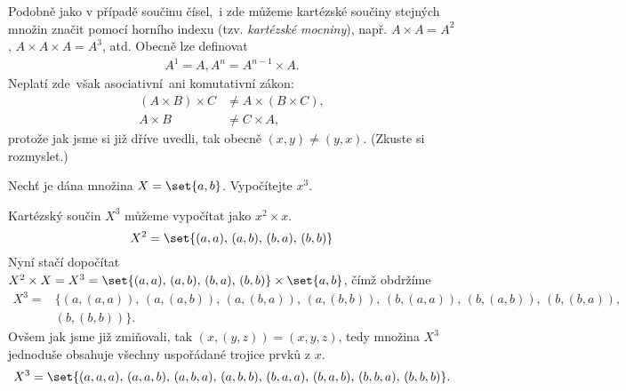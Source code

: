 Podobně jako v případě součinu čísel,~i zde můžeme kartézské součiny stejných množin značit pomocí horního indexu (tzv. \emph{kartézské mocniny}), např. $A\times A=A^2$, $A\times A\times A=A^3$, atd. Obecně lze definovat
\begin{align*}
    A^1=A,
    A^n=A^{n-1}\times A.
\end{align*}
Neplatí zde~však asociativní~ani komutativní zákon:
\begin{align*}
    (A\times B)\times C&\neq A\times (B\times C),\\
    A\times B&\neq C\times A,
\end{align*}
protože jak jsme si již dříve uvedli, tak obecně $(x,y)\neq (y,x)$. (Zkuste si rozmyslet.)
\begin{example}
    Nechť je dána množina $X=\set{a,b}$. Vypočítejte $x^3$.
\end{example}
\begin{solution}
    Kartézský součin $X^3$ můžeme vypočítat jako $x^2\times x$.
    \begin{equation*}
        X^2=\set{(a,a),\,(a,b),\,(b,a),\,(b,b)}
    \end{equation*}
    Nyní stačí dopočítat $X^2\times X=X^3=\set{(a,a),\,(a,b),\,(b,a),\,(b,b)}\times\set{a,b}$, čímž obdržíme
    \begin{align*}
        X^3=&\{(a,(a,a)),\,(a,(a,b)),\,(a,(b,a)),\,(a,(b,b)),\,(b,(a,a)),\,(b,(a,b)),\,(b,(b,a)),\\
        &(b,(b,b))\}.
    \end{align*}
    Ovšem jak jsme již zmiňovali, tak $(x,(y,z))=(x,y,z)$, tedy množina $X^3$ jednoduše obsahuje všechny uspořádané trojice prvků z $x$.
    \begin{equation*}
        X^3=\set{(a,a,a),\,(a,a,b),\,(a,b,a),\,(a,b,b),\,(b,a,a),\,(b,a,b),\,(b,b,a),\,(b,b,b)}.
    \end{equation*}
\end{solution}